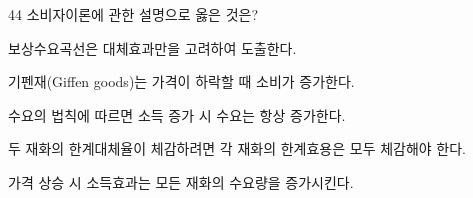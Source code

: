 \begin{question}{44}
소비자이론에 관한 설명으로 옳은 것은?
\begin{choices}
  \item 보상수요곡선은 대체효과만을 고려하여 도출한다.
  \item 기펜재(Giffen goods)는 가격이 하락할 때 소비가 증가한다.
  \item 수요의 법칙에 따르면 소득 증가 시 수요는 항상 증가한다.
  \item 두 재화의 한계대체율이 체감하려면 각 재화의 한계효용은 모두 체감해야 한다.
  \item 가격 상승 시 소득효과는 모든 재화의 수요량을 증가시킨다.
\end{choices}
\end{question}
